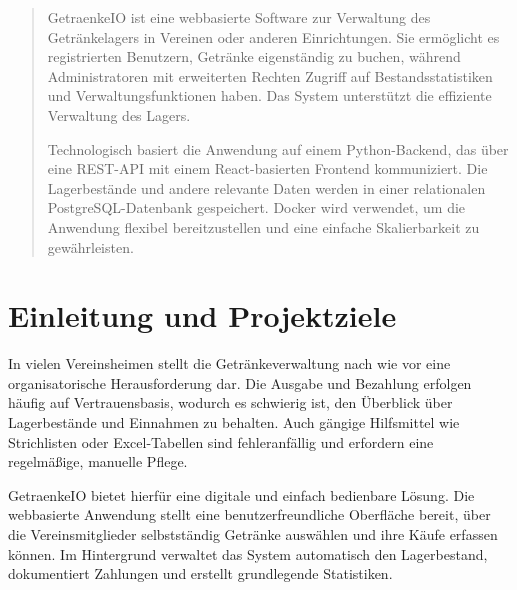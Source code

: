 \documentclass[conference,a4paper]{cs-techrep}
\begin{document}
\selectlanguage{\cstechrepLang}

\maketitle

\begin{abstract}
GetraenkeIO ist eine webbasierte Software zur Verwaltung des Getränkelagers in Vereinen oder anderen Einrichtungen. Sie ermöglicht es registrierten Benutzern, Getränke eigenständig zu buchen, während Administratoren mit erweiterten Rechten Zugriff auf Bestandsstatistiken und Verwaltungsfunktionen haben. Das System unterstützt die effiziente Verwaltung des Lagers.

Technologisch basiert die Anwendung auf einem Python-Backend, das über eine REST-API mit einem React-basierten Frontend kommuniziert. Die Lagerbestände und andere relevante Daten werden in einer relationalen PostgreSQL-Datenbank gespeichert. Docker wird verwendet, um die Anwendung flexibel bereitzustellen und eine einfache Skalierbarkeit zu gewährleisten.
\end{abstract}


\section{Einleitung und Projektziele}
In vielen Vereinsheimen stellt die Getränkeverwaltung nach wie vor eine organisatorische Herausforderung dar. Die Ausgabe und Bezahlung erfolgen häufig auf Vertrauensbasis, wodurch es schwierig ist, den Überblick über Lagerbestände und Einnahmen zu behalten. Auch gängige Hilfsmittel wie Strichlisten oder Excel-Tabellen sind fehleranfällig und erfordern eine regelmäßige, manuelle Pflege.

GetraenkeIO bietet hierfür eine digitale und einfach bedienbare Lösung. Die webbasierte Anwendung stellt eine benutzerfreundliche Oberfläche bereit, über die Vereinsmitglieder selbstständig Getränke auswählen und ihre Käufe erfassen können. Im Hintergrund verwaltet das System automatisch den Lagerbestand, dokumentiert Zahlungen und erstellt grundlegende Statistiken.
\end{document}

